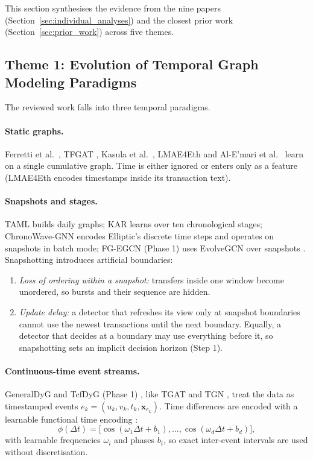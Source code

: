 \documentclass[11pt,a4paper]{article}
\begin{document}
This section synthesises the evidence from the nine papers (Section~\ref{sec:individual_analyses}) and the closest prior work (Section~\ref{sec:prior_work}) across five themes.

\subsection{Theme 1: Evolution of Temporal Graph Modeling Paradigms}
The reviewed work falls into three temporal paradigms.

\paragraph{Static graphs.} Ferretti et al.\ \cite{ferretti2025aml}, TFGAT \cite{li2025tfgat}, Kasula et al.\ \cite{kasula2025ajk}, LMAE4Eth \cite{jia2025lmae4eth} and Al-E'mari et al.\ \cite{alemari2026explainable} learn on a single cumulative graph. Time is either ignored or enters only as a feature (LMAE4Eth encodes timestamps inside its transaction text).

\paragraph{Snapshots and stages.} TAML \cite{rico2026taml} builds daily graphs; KAR \cite{tian2025kar} learns over ten chronological stages; ChronoWave-GNN \cite{lin2026chronowave} encodes Elliptic's discrete time steps and operates on snapshots in batch mode; FG-EGCN (Phase 1) uses EvolveGCN over snapshots \cite{han2026fgegcn}. Snapshotting introduces artificial boundaries:
\begin{enumerate}[leftmargin=*]
    \item \textit{Loss of ordering within a snapshot:} transfers inside one window become unordered, so bursts and their sequence are hidden.
    \item \textit{Update delay:} a detector that refreshes its view only at snapshot boundaries cannot use the newest transactions until the next boundary. Equally, a detector that decides at a boundary may use everything before it, so snapshotting sets an implicit decision horizon (Step 1).
\end{enumerate}

\paragraph{Continuous-time event streams.} GeneralDyG \cite{yang2025generaldyg} and TcfDyG (Phase 1) \cite{li2026tcfdyg}, like TGAT \cite{xu2020tgat} and TGN \cite{rossi2020tgn}, treat the data as timestamped events $e_k=(u_k,v_k,t_k,\mathbf{x}_{e_k})$. Time differences are encoded with a learnable functional time encoding \cite{xu2020tgat,rossi2020tgn}:
\begin{equation}
    \phi(\Delta t) = \big[\cos(\omega_1 \Delta t + b_1), \dots, \cos(\omega_d \Delta t + b_d)\big],
\end{equation}
with learnable frequencies $\omega_i$ and phases $b_i$, so exact inter-event intervals are used without discretisation.
\end{document}
